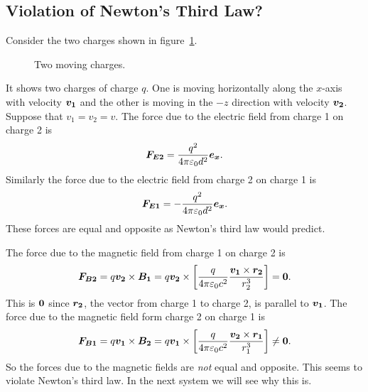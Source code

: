     \subsection{Violation of Newton's Third Law?}
    Consider the two charges shown in figure~\ref{fig:violation of N3 setup}.
    \begin{figure}[ht]
        \centering
        \caption{Two moving charges.}
        \label{fig:violation of N3 setup}
    \end{figure}
    It shows two charges of charge \(q\).
    One is moving horizontally along the \(x\)-axis with velocity \(\bm{v_1}\) and the other is moving in the \(-z\) direction with velocity \(\bm{v_2}\).
    Suppose that \(v_1 = v_2 = v\).
    The force due to the electric field from charge 1 on charge 2 is
    \[\bm{F_{E2}} = \frac{q^2}{4\pi\varepsilon_0d^2}\bm{e_{x}}.\]
    Similarly the force due to the electric field from charge 2 on charge 1 is
    \[\bm{F_{E1}} = -\frac{q^2}{4\pi\varepsilon_0d^2}\bm{e_{x}}.\]
    These forces are equal and opposite as Newton's third law would predict.
    
    The force due to the magnetic field from charge 1 on charge 2 is
    \[\bm{F_{B2}} = q\bm{v_2}\times\bm{B_1} = q\bm{v_2}\times\left[\frac{q}{4\pi\varepsilon_0c^2}\frac{\bm{v_1}\times\bm{r_2}}{r_2^3}\right] = \bm{0}.\]
    This is \(\bm{0}\) since \(\bm{r_2}\), the vector from charge 1 to charge 2, is parallel to \(\bm{v_1}\).
    The force due to the magnetic field form charge 2 on charge 1 is
    \[\bm{F_{B1}} = q\bm{v_1}\times\bm{B_2} = q\bm{v_1} \times \left[\frac{q}{4\pi\varepsilon_0c^2}\frac{\bm{v_2}\times\bm{r_1}}{r_1^3}\right]\ne \bm{0}.\]
    So the forces due to the magnetic fields are \emph{not} equal and opposite.
    This seems to violate Newton's third law.
    In the next system we will see why this is.
    
